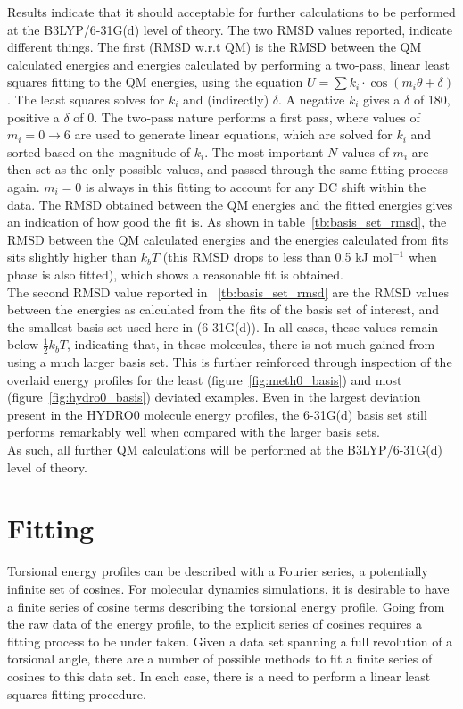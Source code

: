 \documentclass[11pt, oneside, draft]{article}   	%
\begin{document}
Results indicate that it should acceptable for further calculations to be performed at the B3LYP/6-31G(d) level of theory. The two RMSD values reported, indicate different things. The first (RMSD w.r.t QM) is the RMSD between the QM calculated energies and energies calculated by performing a two-pass, linear least squares fitting to the QM energies, using the equation $U = \sum k_i \cdot \cos(m_i\theta + \delta)$. The least squares solves for $k_i$ and (indirectly) $\delta$. A negative $k_i$ gives a $\delta$ of 180, positive a $\delta$ of 0. The two-pass nature performs a first pass, where values of $m_i = 0 \to 6$ are used to generate linear equations, which are solved for $k_i$ and sorted based on the magnitude of $k_i$. The most important $N$ values of $m_i$ are then set as the only possible values, and passed through the same fitting process again. $m_i = 0$ is always in this fitting to account for any DC shift within the data. The RMSD obtained between the QM energies and the fitted energies gives an indication of how good the fit is. As shown in table~\ref{tb:basis_set_rmsd}, the RMSD between the QM calculated energies and the energies calculated from fits sits slightly higher than $k_bT$ (this RMSD drops to less than 0.5 kJ mol$^{-1}$ when phase is also fitted), which shows a reasonable fit is obtained.\\
The second RMSD value reported in ~\ref{tb:basis_set_rmsd} are the RMSD values between the energies as calculated from the fits of the basis set of interest, and the smallest basis set used here in (6-31G(d)). In all cases, these values remain below $\frac{1}{2}k_bT$, indicating that, in these molecules, there is not much gained from using a much larger basis set. This is further reinforced through inspection of the overlaid energy profiles for the least (figure~\ref{fig:meth0_basis}) and most (figure~\ref{fig:hydro0_basis}) deviated examples. Even in the largest deviation present in the HYDRO0 molecule energy profiles, the 6-31G(d) basis set still performs remarkably well when compared with the larger basis sets.\\
As such, all further QM calculations will be performed at the B3LYP/6-31G(d) level of theory.

\section{Fitting}
Torsional energy profiles can be described with a Fourier series, a potentially infinite set of cosines. For molecular dynamics simulations, it is desirable to have a finite series of cosine terms describing the torsional energy profile. Going from the raw data of the energy profile, to the explicit series of cosines requires a fitting process to be under taken. Given a data set spanning a full revolution of a torsional angle, there are a number of possible methods to fit a finite series of cosines to this data set. In each case, there is a need to perform a linear least squares fitting procedure.
\end{document}
